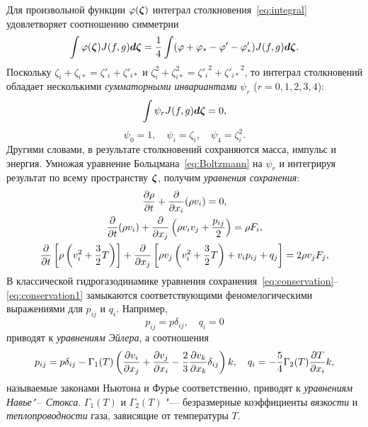 Для произвольной функции \(\phi(\bzeta)\) интеграл столкновения~\eqref{eq:integral}
удовлетворяет соотношению симметрии
\begin{equation}\label{eq:ci_symmetry}
    \int\phi(\bzeta)J(f,g)\dzeta = \frac14\int(\phi+\phi_*-\phi'-\phi'_*) J(f,g)\dzeta.
\end{equation}
Поскольку \(\zeta_i+\zeta_{i*}=\zeta'_i+\zeta'_{i*}\) и \(\zeta_i^2+\zeta_{i*}^2={\zeta'_i}^2+{\zeta'_{i*}}^{\!\!2}\),
то интеграл столкновений обладает несколькими \emph{сумматорными инвариантами} \(\psi_r\) (\(r=0, 1, 2, 3, 4\)):
\begin{equation}\label{eq:conser_moments}
    \int \psi_r J(f,g)\dzeta = 0,
\end{equation}
\begin{equation}\label{eq:summational_invariants}
    \psi_0 = 1, \quad \psi_i = \zeta_i, \quad \psi_4 = \zeta_i^2.
\end{equation}
Другими словами, в результате столкновений сохраняются масса, импульс и энергия.
Умножая уравнение Больцмана~\eqref{eq:Boltzmann} на \(\psi_r\)
и интегрируя результат по всему пространству \(\bzeta\), получим \emph{уравнения сохранения}:
\begin{gather}\label{eq:conservation}
    \pder[\rho]{t} + \pder{x_i}(\rho v_i) = 0, \\
    \pder{t}(\rho v_i) + \pder{x_j}\left( \rho v_i v_j + \frac{p_{ij}}2 \right) = \rho F_i, \\
    \pder{t}\left[ \rho\left( v_i^2 + \frac32T \right) \right]
        + \pder{x_j}\left[ \rho v_j\left( v_i^2 + \frac32T \right) + v_i p_{ij} + q_j \right]
        = 2\rho v_j F_j, \label{eq:conservation1}
\end{gather}
В классической гидрогазодинамике уравнения сохранения~\eqref{eq:conservation}--\eqref{eq:conservation1}
замыкаются соответствующими феномелогическими выражениями для \(p_{ij}\) и \(q_i\). Например,
\begin{equation}\label{eq:Euler}
    p_{ij} = p\delta_{ij}, \quad q_i = 0
\end{equation}
приводят к \emph{уравнениям Эйлера}, а соотношения
\begin{equation}\label{eq:Navier-Stokes}
    p_{ij} = p\delta_{ij} - \Gamma_1(T)\left( \pder[v_i]{x_j} + \pder[v_j]{x_i}
        - \frac23\pder[v_k]{x_k}\delta_{ij} \right)k, \quad
    q_i = -\frac54\Gamma_2(T)\pder[T]{x_i}k,
\end{equation}
называемые законами Ньютона и Фурье соответственно,
приводят к \emph{уравнениям Навье"--~Стокса}.
\(\Gamma_1(T)\) и \(\Gamma_2(T)\) "--- безразмерные коэффициенты \emph{вязкости}
и \emph{теплопроводности} газа, зависящие от температуры \(T\).

